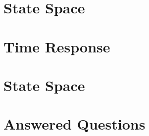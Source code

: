 \documentclass{article}
\begin{document}
\pagecolor{mainTheme}\afterpage{\pagecolor{backCirc}}
\maketitle
\thispagestyle{empty}


\newcommand{\TonDpage}[1]{
  \newpage
  \renewcommand{\Places}{#1}
}


\newcommand{\myfrac}[3][3pt]{\frac{\raisebox{10pt}{#2}}{\raisebox{-10pt}{#3}}}

\TonDpage{State Space}
\vspace*{-0.5 em}
\section{State Space}

\vspace{10pt}

\section{Time Response}

\vspace{10pt}

\TonDpage{State Space}
\section{State Space}

\vspace{10pt}

\section{Answered Questions}

\end{document}
